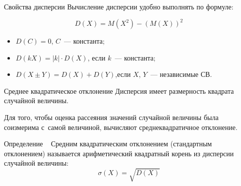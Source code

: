 \documentclass[unicode,11pt,notheorems,xcolor=table]{beamer}
\begin{document}
\begin{frame}{Свойства дисперсии}{}
    Вычисление дисперсии удобно выполнять по формуле:
    \begin{block}{}
        $$
            D(X) = M(X^2)-(M(X))^2
        $$
    \end{block}

    \begin{itemize}
        \item $D(C) = 0$,  $C$~--- константа;
        \item  $D(kX) = |k|\cdot D(X)$, \hfill если $k$~--- константа;
        \item $D(X \pm Y) = D(X) + D(Y)$,\hfill если $X$, $Y$~--- независимые СВ.
    \end{itemize}
    
\end{frame}

\begin{frame}{Среднее квадратическое отклонение}{}
    Дисперсия имеет размерность квадрата случайной величины.
    
    Для того, чтобы оценка рассеяния значений случайной величины была соизмерима с~самой величиной, вычисляют среднеквадратичное отклонение.

    \begin{block}{Определение}
 
    Средним квадратическим отклонением (стандартным отклонением) называется арифметический квадратный корень из дисперсии случайной величины:
    $$
        \sigma(X) = \sqrt{D(X)}
    $$
    \end{block}
\end{frame}
\end{document}
